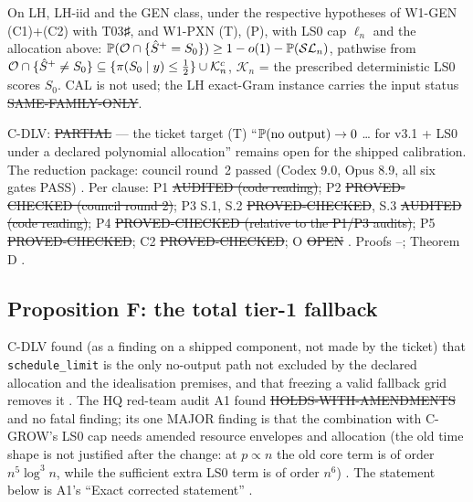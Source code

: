 \begin{corollary}\label{cor:Dprime}
On LH, LH-iid and the GEN class, under the respective hypotheses of W1-GEN (C1)+(C2) with T03♯, and W1-PXN (T), (P), with LS0 cap $\ell_n$ and the allocation above: $\mathbb P(\mathcal O\cap\{\hat S^{+}=S_0\})\ge1-o(1)-\mathbb P(\mathcal{SL}_n)$, pathwise from $\mathcal O\cap\{\hat S^{+}\ne S_0\}\subseteq\{\pi(S_0\mid y)\le\frac12\}\cup\mathcal K_n^c$, $\mathcal K_n$ = the prescribed deterministic LS0 scores $S_0$. CAL is not used; the LH exact-Gram instance carries the input status \st{SAME-FAMILY-ONLY}.
\end{corollary}
\begin{statusbox}
C-DLV: \st{PARTIAL} — the ticket target (T) ``$\mathbb P(\text{no output})\to0$ \ldots{} for v3.1 + LS0 under a declared polynomial allocation'' remains open for the shipped calibration. The reduction package: council round~2 passed (Codex 9.0, Opus 8.9, all six gates PASS) . Per clause: P1 \st{AUDITED (code reading)}; P2 \st{PROVED-CHECKED (council round 2)}; P3 S.1, S.2 \st{PROVED-CHECKED}, S.3 \st{AUDITED (code reading)}; P4 \st{PROVED-CHECKED (relative to the P1/P3 audits)}; P5 \st{PROVED-CHECKED}; C2 \st{PROVED-CHECKED}; O \st{OPEN} . Proofs --; Theorem D .
\end{statusbox}

\subsection{Proposition F: the total tier-1 fallback}
C-DLV found (as a finding on a shipped component, not made by the ticket) that \texttt{schedule\_limit} is the only no-output path not excluded by the declared allocation and the idealisation premises, and that freezing a valid fallback grid removes it . The HQ red-team audit A1 found \st{HOLDS-WITH-AMENDMENTS} and no fatal finding; its one MAJOR finding is that the combination with C-GROW's LS0 cap needs amended resource envelopes and allocation (the old time shape is not justified after the change: at $p\propto n$ the old core term is of order $n^5\log^3n$, while the sufficient extra LS0 term is of order $n^6$) . The statement below is A1's ``Exact corrected statement'' .

